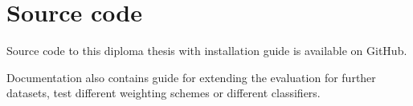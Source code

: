 \chapter{Source code}
\label{appendix:code}

Source code to this diploma thesis with installation guide is available on GitHub. 
\*%

Documentation also contains guide for extending the evaluation for further datasets, test different weighting schemes or different classifiers.
